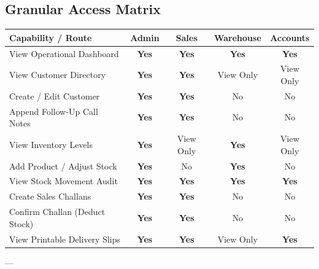 \documentclass[11pt,a4paper]{article}
\begin{document}
\subsection{Granular Access Matrix}
\begin{table}[htbp]
\centering
\small
\begin{tabularx}{\textwidth}{X c c c c}
\toprule
\textbf{Capability / Route} & \textbf{Admin} & \textbf{Sales} & \textbf{Warehouse} & \textbf{Accounts} \\
\midrule
View Operational Dashboard & \textcolor{accent}{\textbf{Yes}} & \textcolor{accent}{\textbf{Yes}} & \textcolor{accent}{\textbf{Yes}} & \textcolor{accent}{\textbf{Yes}} \\
View Customer Directory & \textcolor{accent}{\textbf{Yes}} & \textcolor{accent}{\textbf{Yes}} & View Only & View Only \\
Create / Edit Customer & \textcolor{accent}{\textbf{Yes}} & \textcolor{accent}{\textbf{Yes}} & No & No \\
Append Follow-Up Call Notes & \textcolor{accent}{\textbf{Yes}} & \textcolor{accent}{\textbf{Yes}} & No & No \\
View Inventory Levels & \textcolor{accent}{\textbf{Yes}} & View Only & \textcolor{accent}{\textbf{Yes}} & View Only \\
Add Product / Adjust Stock & \textcolor{accent}{\textbf{Yes}} & No & \textcolor{accent}{\textbf{Yes}} & No \\
View Stock Movement Audit & \textcolor{accent}{\textbf{Yes}} & \textcolor{accent}{\textbf{Yes}} & \textcolor{accent}{\textbf{Yes}} & \textcolor{accent}{\textbf{Yes}} \\
Create Sales Challans & \textcolor{accent}{\textbf{Yes}} & \textcolor{accent}{\textbf{Yes}} & No & No \\
Confirm Challan (Deduct Stock) & \textcolor{accent}{\textbf{Yes}} & \textcolor{accent}{\textbf{Yes}} & No & No \\
View Printable Delivery Slips & \textcolor{accent}{\textbf{Yes}} & \textcolor{accent}{\textbf{Yes}} & View Only & \textcolor{accent}{\textbf{Yes}} \\
\bottomrule
\end{tabularx}
\end{table}

---

\end{document}

